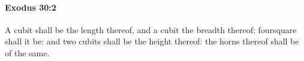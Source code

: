 
		\paragraph{Exodus 30:2} %
			\label{EXODUS-30-2}

			A cubit shall be the length thereof, and a cubit the breadth thereof; foursquare shall it be: and two cubits shall be the height thereof: the horns thereof shall be of the same.


